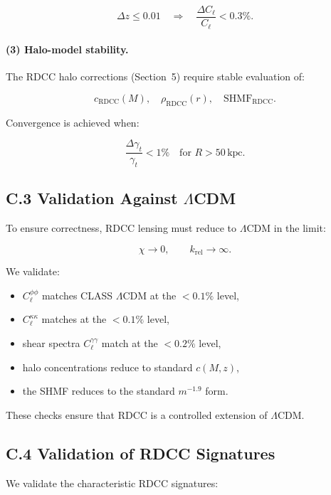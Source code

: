 \documentclass[11pt,a4paper]{article}
\begin{document}
\[
\Delta z \leq 0.01
\quad \Rightarrow \quad
\frac{\Delta C_{\ell}}{C_{\ell}} < 0.3\%.
\]



\paragraph{(3) Halo-model stability.}
The RDCC halo corrections (Section~5) require stable evaluation of:


\[
c_{\mathrm{RDCC}}(M), \quad
\rho_{\mathrm{RDCC}}(r), \quad
\mathrm{SHMF}_{\mathrm{RDCC}}.
\]


Convergence is achieved when:


\[
\frac{\Delta \gamma_{t}}{\gamma_{t}} < 1\%
\quad \text{for } R > 50\,\mathrm{kpc}.
\]



\subsection*{C.3 Validation Against $\Lambda$CDM}

To ensure correctness, RDCC lensing must reduce to $\Lambda$CDM in the limit:


\[
\chi \rightarrow 0,
\qquad
k_{\mathrm{rel}} \rightarrow \infty.
\]



We validate:
\begin{itemize}
\item $C_{\ell}^{\phi\phi}$ matches CLASS $\Lambda$CDM at the $<0.1\%$ level,
\item $C_{\ell}^{\kappa\kappa}$ matches at the $<0.1\%$ level,
\item shear spectra $C_{\ell}^{\gamma\gamma}$ match at the $<0.2\%$ level,
\item halo concentrations reduce to standard $c(M,z)$,
\item the SHMF reduces to the standard $m^{-1.9}$ form.
\end{itemize}

These checks ensure that RDCC is a controlled extension of $\Lambda$CDM.

\subsection*{C.4 Validation of RDCC Signatures}

We validate the characteristic RDCC signatures:
\end{document}
